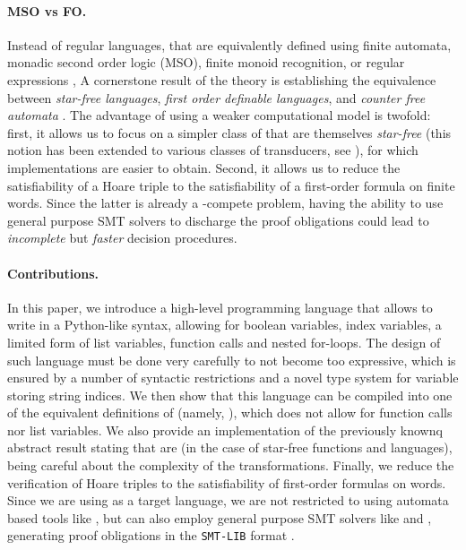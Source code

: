 \paragraph{MSO vs FO.} \AP Instead of regular languages, that are equivalently
defined using finite automata, monadic second order logic (MSO), finite monoid
recognition, or regular expressions \cite{buchi1960weak,KLEE56,TRAK66,SCHU61},
A cornerstone result of the theory is establishing the equivalence between
\emph{star-free languages}, \emph{first order definable languages}, and
\emph{counter free automata} \cite{PEPI86,SCHU65,MNPA71}. The advantage of
using a weaker computational model is twofold: first, it allows us to focus on
a simpler class of  that are themselves
\emph{star-free} (this notion has been extended to various classes of
transducers, see \cite{CADA15,BDK18,MUSC19,bojanczyk2018polyregular}), for
which implementations are easier to obtain. Second, it allows us to reduce the
satisfiability of a Hoare triple to the satisfiability of a first-order formula
on finite words. Since the latter is already a \TOWER-compete problem, having
the ability to use general purpose SMT solvers to discharge the proof
obligations could lead to \emph{incomplete} but \emph{faster} decision
procedures.

\paragraph{Contributions.} \AP In this paper, we introduce a high-level
programming language that allows to write 
in a Python-like syntax, allowing for boolean variables, index variables, a
limited form of list variables, function calls and nested for-loops. The design
of such language must be done very carefully to not become too expressive,
which is ensured by a number of syntactic restrictions and a novel type system
for variable storing string indices. We then show that this language can be
compiled into one of the equivalent definitions of 
(namely, ), which does not allow for function calls nor
list variables. We also provide an implementation of the previously knownq
abstract result stating that  are  (in the case of star-free functions and languages), being careful
about the complexity of the transformations. Finally, we reduce the
verification of Hoare triples to the satisfiability of first-order formulas on
words. Since we are using  as a target language, we are
not restricted to using automata based tools like  \cite{MONA01},
but can also employ general purpose SMT solvers like  \cite{z3} and
 \cite{cvc5}, generating proof obligations in the \texttt{SMT-LIB}
format \cite{BARRETT17}.


